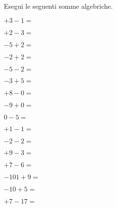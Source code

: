 \begin{esercizio}
Esegui le seguenti somme algebriche.
 \label{ese:2.14}

\vspace{-1em}
 \begin{htmulticols}{4}
 \begin{enumeratees}
 \item \(+3 -1 =\)%
 \item \(+2 -3 =\)
 \item \(-5 +2 =\)
 \item \(-2 +2 =\)
 \item \(-5 -2 =\)
 \item \(-3 +5 =\)
 \item \(+8 -0 =\)
 \item \(-9 +0 =\)
 \item \(0 -5 =\)
 \item \(+1 -1 =\)
 \item \(-2 -2 =\)
 \item \(+9 -3 =\)
 \item \(+7 -6 =\)
 \item \(-101 +9 =\)
 \item \(-10 +5 =\)
 \item \(+7 -17 =\)
 \end{enumeratees}
\end{htmulticols}
\end{esercizio}

